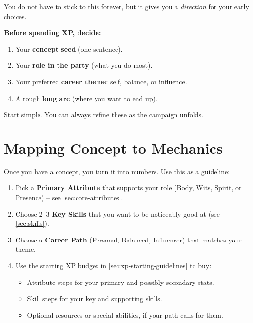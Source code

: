 You do not have to stick to this forever, but it gives you a \emph{direction}
for your early choices.

\begin{tcolorbox}[colback=blue!5!white,colframe=blue!75!black,title=Character Career Checklist,fonttitle=\bfseries]
\textbf{Before spending XP, decide:}
\begin{enumerate}
  \item Your \textbf{concept seed} (one sentence).
  \item Your \textbf{role in the party} (what you do most).
  \item Your preferred \textbf{career theme}: self, balance, or influence.
  \item A rough \textbf{long arc} (where you want to end up).
\end{enumerate}
Start simple. You can always refine these as the campaign unfolds.
\end{tcolorbox}


\section{Mapping Concept to Mechanics}
\label{sec:xp-mapping}

Once you have a concept, you turn it into numbers. Use this as a guideline:

\begin{enumerate}
  \item Pick a \textbf{Primary Attribute} that supports your role
    (Body, Wits, Spirit, or Presence) – see \ref{sec:core-attributes}.
  \item Choose 2--3 \textbf{Key Skills} that you want to be noticeably good at
    (see \ref{sec:skills}).
  \item Choose a \textbf{Career Path} (Personal, Balanced, Influencer) that matches
        your theme.
  \item Use the starting XP budget in \ref{sec:xp-starting-guidelines} to buy:
    \begin{itemize}
      \item Attribute steps for your primary and possibly secondary stats.
      \item Skill steps for your key and supporting skills.
      \item Optional resources or special abilities, if your path calls for them.
    \end{itemize}
\end{enumerate}

